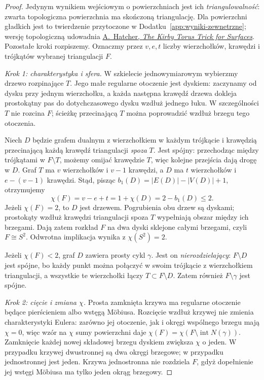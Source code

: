 \begin{proof}
Jedynym wynikiem wejściowym o powierzchniach
jest ich \emph{triangulowalność}: zwarta
topologiczna powierzchnia ma skończoną
triangulację. Dla powierzchni gładkich jest
to twierdzenie przytoczone w
Dodatku~\ref{app:wyniki-zewnetrzne}; wersję
topologiczną udowadnia
\href{https://pi.math.cornell.edu/~hatcher/Papers/TorusTrick.pdf}
{A.\ Hatcher, \emph{The Kirby Torus Trick for Surfaces}}.
Pozostałe kroki rozpiszemy. Oznaczmy przez
$v,e,t$ liczby wierzchołków, krawędzi
i trójkątów wybranej triangulacji $F$.

\emph{Krok 1: charakterystyka i sfera.}
W szkielecie jednowymiarowym wybierzmy
drzewo rozpinające $T$. Jego małe regularne
otoczenie jest dyskiem: zaczynamy od dysku
przy jednym wierzchołku, a każda następna
krawędź drzewa dokleja prostokątny pas
do dotychczasowego dysku wzdłuż jednego łuku.
W szczególności $T$ nie rozcina $F$;
ścieżkę przecinającą $T$ można poprowadzić
wzdłuż brzegu tego otoczenia.

Niech $D$ będzie grafem dualnym z wierzchołkiem
w każdym trójkącie i krawędzią przecinającą
każdą krawędź triangulacji \emph{spoza} $T$.
Jest spójny: przechodząc między trójkątami
w $F\setminus T$, możemy omijać krawędzie
$T$, więc kolejne przejścia dają drogę w $D$.
Graf $T$ ma $v$ wierzchołków i $v-1$ krawędzi,
a $D$ ma $t$ wierzchołków i $e-(v-1)$ krawędzi.
Stąd, pisząc $b_1(D)=|E(D)|-|V(D)|+1$,
otrzymujemy
\[
 \chi(F)=v-e+t=1+\chi(D)=2-b_1(D)\leq 2.
\]
Jeżeli $\chi(F)=2$, to $D$ jest drzewem.
Pogrubienia obu drzew są dyskami;
prostokąty wzdłuż krawędzi triangulacji
spoza $T$ wypełniają obszar między ich
brzegami. Dają zatem rozkład $F$ na dwa
dyski sklejone całymi brzegami, czyli
$F\cong S^2$. Odwrotna implikacja wynika
z $\chi(S^2)=2$.

Jeżeli $\chi(F)<2$, graf $D$ zawiera prosty
cykl $\gamma$. Jest on \emph{nierozdzielający}:
$F\setminus D$ jest spójne, bo każdy punkt
można połączyć w swoim trójkącie z wierzchołkiem
triangulacji, a wszystkie te wierzchołki łączy
$T\subset F\setminus D$. Zatem również
$F\setminus\gamma$ jest spójne.

\emph{Krok 2: cięcie i zmiana $\chi$.}
Prosta zamknięta krzywa ma regularne otoczenie
będące pierścieniem albo wstęgą Möbiusa.
Rozcięcie wzdłuż krzywej nie zmienia
charakterystyki Eulera: zarówno jej
otoczenie, jak i okręgi wspólnego brzegu
mają $\chi=0$, więc wzór na $\chi$ sumy
powierzchni daje $\chi(F)=\chi(F\setminus
\operatorname{int}N(\gamma))$.
Zamknięcie każdej nowej składowej brzegu
dyskiem zwiększa $\chi$ o jeden.
W przypadku krzywej dwustronnej są dwa
okręgi brzegowe; w przypadku jednostronnej
jest jeden. Krzywa jednostronna nie rozdziela
$F$, gdyż dopełnienie jej wstęgi Möbiusa
ma tylko jeden okrąg brzegowy.


\end{proof}
